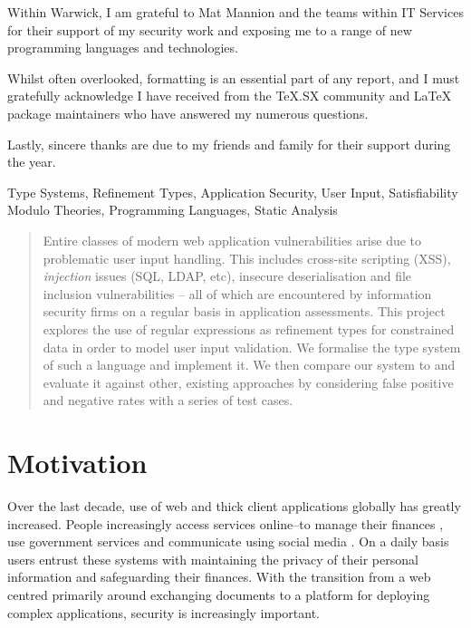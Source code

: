 \documentclass[a4paper,openany,12pt]{book}
\begin{document}
Within Warwick, I am grateful to Mat Mannion and the teams within IT Services for their support of
my security work and exposing me to a range of new programming languages and technologies.

Whilst often overlooked, formatting is an essential part of any report, and I must gratefully acknowledge I have
received from the TeX.SX community and \LaTeX{} package maintainers who have answered my numerous questions.

Lastly, sincere thanks are due to my friends and family for their support during the year.

\pagebreak[5]
\begin{keywords}
    Type Systems, Refinement Types, Application Security, User Input, Satisfiability Modulo Theories,
    Programming Languages, Static Analysis
\end{keywords}

\vspace{0.5em}

\begin{abstract}
    Entire classes of modern web application vulnerabilities arise due to problematic user input handling.
    This includes cross-site scripting (XSS), \emph{injection} issues (SQL, LDAP, etc), insecure deserialisation and
    file inclusion vulnerabilities – all of which are encountered by information security firms on a regular basis in application assessments.
    This project explores the use of regular expressions as refinement types for constrained data in order to model user input validation.
    We formalise the type system of such a language and implement it.
    We then compare our system to and evaluate it against other, existing approaches by considering false positive and negative rates with a series of test cases.
\end{abstract}
\titlespacing*{\chapter}
{0pt}{0pt}{2.0ex}

\chapter{Motivation}

Over the last decade, use of web and thick client applications globally has greatly increased.
People increasingly access services online--to manage their finances \citep{jayawardhena2000changes}, use government
services \citep{fox2010directgov} and communicate using social media \citep{boulianne2015social}.
On a daily basis users entrust these systems with maintaining the privacy of their personal information and safeguarding
their finances.
With the transition from a web centred primarily around exchanging documents to a platform for deploying complex
applications, security is increasingly important.
\end{document}
